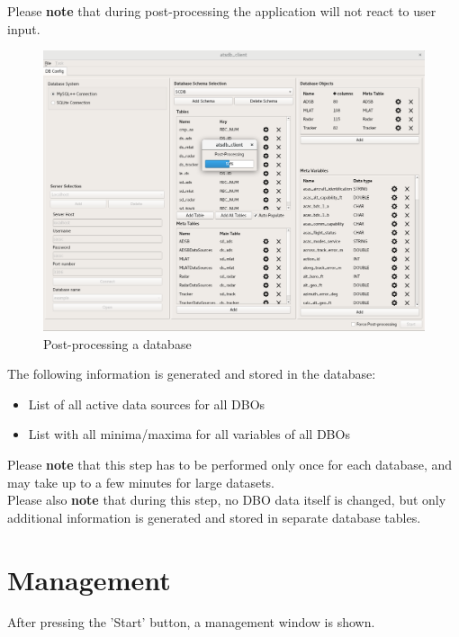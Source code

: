\documentclass[10pt,letterpaper,extrafontsizes]{memoir}
\begin{document}
Please \textbf{note} that during post-processing the application will not react to user input. \\


\begin{figure}[H]
  \hspace*{-2cm}
    \includegraphics[width=18cm,frame]{../screenshots/db_postprocessing.png}
  \caption{Post-processing a database}
  \label{fig:db_postprocessing}
\end{figure}

The following information is generated and stored in the database:

\begin{itemize}  
\item List of all active data sources for all DBOs
\item List with all minima/maxima for all variables of all DBOs
\end{itemize}

Please \textbf{note} that this step has to be performed only once for each database, and may take up to a few minutes for large datasets. \\

Please also \textbf{note} that during this step, no DBO data itself is changed, but only additional information is generated and stored in separate database tables.

\section{Management}
\label{sec:management}

After pressing the 'Start' button, a management window is shown.
\end{document}

